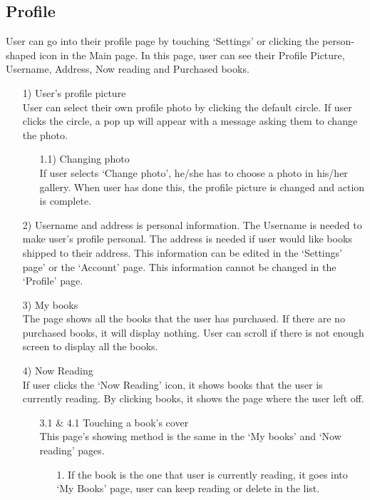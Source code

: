 \documentclass[conference]{IEEEtran}
\begin{document}
\subsection{Profile}
User can go into their profile page by touching ‘Settings’ or clicking the person-shaped icon in the Main page. In this page, user can see their Profile Picture, Username, Address, Now reading and Purchased books.
\begin{itemize}
    \item[1)] User’s profile picture \\
    User can select their own profile photo by clicking the default circle. If user clicks the circle, a pop up will appear with a message asking them to change the photo.
    \begin{itemize} 
        \item[1.1)] Changing photo \\
        If user selects ‘Change photo’, he/she has to choose a photo in his/her gallery. When user has done this, the profile picture is changed and action is complete.
    \end{itemize}
    \item[2)] Username and address is personal information. The Username is needed to make user’s profile personal. The address is needed if user would like books shipped to their address. This information can be edited in the ‘Settings’ page’ or the ‘Account’ page. This information cannot be changed in the ‘Profile’ page.
    \item[3)] My books \\
    The page shows all the books that the user has purchased. If there are no purchased books, it will display nothing. User can scroll if there is not enough screen to display all the books.
    \item[4)] Now Reading \\
    If user clicks the ‘Now Reading’ icon, it shows books that the user is currently reading. By clicking books, it shows the page where the user left off.
    \begin{itemize} 
        \item[3.1 & 4.1] Touching a book’s cover \\
        This page’s showing method is the same in the ‘My books’ and ‘Now reading’ pages.
        \begin{itemize} 
            \item[1.] If the book is the one that user is currently reading, it goes into ‘My Books’ page, user can keep reading or delete in the list.

\end{itemize}
\end{itemize}
\end{itemize}
\end{document}
